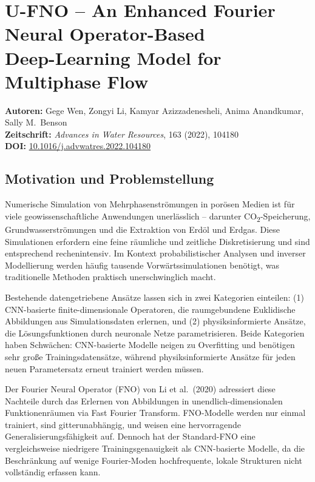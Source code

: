 \documentclass[a4paper,12pt]{article}
\begin{document}
\section*{U-FNO -- An Enhanced Fourier Neural Operator-Based\\
Deep-Learning Model for Multiphase Flow}

\textbf{Autoren:} Gege Wen, Zongyi Li, Kamyar Azizzadenesheli,
Anima Anandkumar, Sally M.\ Benson \\
\textbf{Zeitschrift:} \textit{Advances in Water Resources}, 163 (2022), 104180 \\
\textbf{DOI:} \href{https://doi.org/10.1016/j.advwatres.2022.104180}{10.1016/j.advwatres.2022.104180}

\subsection*{Motivation und Problemstellung}

Numerische Simulation von Mehrphasenströmungen in porösen Medien ist für
viele geowissenschaftliche Anwendungen unerlässlich -- darunter CO\textsubscript{2}-Speicherung,
Grundwasserströmungen und die Extraktion von Erdöl und Erdgas. Diese Simulationen
erfordern eine feine räumliche und zeitliche Diskretisierung und sind
entsprechend rechenintensiv. Im Kontext probabilistischer Analysen und inverser
Modellierung werden häufig tausende Vorwärtssimulationen benötigt, was
traditionelle Methoden praktisch unerschwinglich macht.

Bestehende datengetriebene Ansätze lassen sich in zwei Kategorien einteilen:
(1) CNN-basierte finite-dimensionale Operatoren, die raumgebundene
Euklidische Abbildungen aus Simulationsdaten erlernen, und (2)
physiksinformierte Ansätze, die Lösungsfunktionen durch neuronale Netze
parametrisieren. Beide Kategorien haben Schwächen: CNN-basierte Modelle
neigen zu Overfitting und benötigen sehr große Trainingsdatensätze, während
physiksinformierte Ansätze für jeden neuen Parametersatz erneut trainiert
werden müssen.

Der Fourier Neural Operator (FNO) von Li et al.\ (2020) adressiert diese
Nachteile durch das Erlernen von Abbildungen in unendlich-dimensionalen
Funktionenräumen via Fast Fourier Transform. FNO-Modelle werden nur einmal
trainiert, sind gitterunabhängig, und weisen eine hervorragende
Generalisierungsfähigkeit auf. Dennoch hat der Standard-FNO eine vergleichsweise
niedrigere Trainingsgenauigkeit als CNN-basierte Modelle, da die Beschränkung
auf wenige Fourier-Moden hochfrequente, lokale Strukturen nicht vollständig
erfassen kann.
\end{document}
